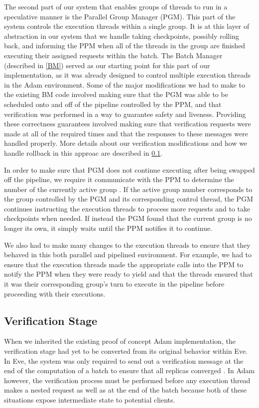 \documentclass[11pt, oneside]{report}
\begin{document}
The second part of our system that enables groups of threads to run in a speculative manner is the Parallel Group Manager (PGM). This part of the system controls the execution threads within a single group.
It is at this layer of abstraction in our system that we handle taking checkpoints, possibly rolling back, and informing the PPM when all of the threads in the group are finished executing their assigned requests within the batch.
The Batch Manager (described in \ref{BM}) served as our starting point for this part of our implementation, as it was already designed to control multiple execution threads in the Adam environment.
Some of the major modifications we had to make to the existing BM code involved making sure that the PGM was able to be scheduled onto and off of the pipeline controlled by the PPM, and that verification was performed in a way to guarantee safety and liveness. 
Providing these correctness guarantees involved making sure that verification requests were made at all of the required times and that the responses to these messages were handled properly. 
More details about our verification modifications and how we handle rollback in this approac are described in \ref{Verification}. 

In order to make sure that PGM does not continue executing after being swapped off the pipeline, we require it communicate with the PPM to determine the number of the currently active group . 
If the active group number corresponds to the group controlled by the PGM and its corresponding control thread, the PGM continues instructing the execution threads to process more requests and to take checkpoints when needed. 
If instead the PGM found that the current group is no longer its own, it simply waits until the PPM notifies it to continue.

We also had to make many changes to the execution threads to ensure that they behaved in this both parallel and pipelined environment.
For example, we had to ensure that the execution threads made the appropriate calls into the PPM to notify the PPM when they were ready to yield and that the threads ensured that it was their corresponding group's turn to execute in the pipeline before proceeding with their executions.

\subsection{Verification Stage}\label{Verification}

When we inherited the existing proof of concept Adam implementation, the verification stage had yet to be converted from its original behavior within Eve.
In Eve, the system was only required to send out a verification message at the end of the computation of a batch to ensure that all replicas converged \cite{eve}.
In Adam however, the verification process must be performed before any execution thread makes a nested request as well as at the end of the batch because both of these situations expose intermediate state to potential clients.
\end{document}
